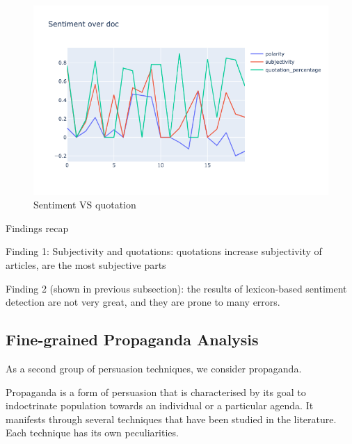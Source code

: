 \begin{figure}[!htbp]
    \centering
    \includegraphics[width=\linewidth]{figures/sentiment_vs_quotation.png}
    \caption{Sentiment VS quotation}
    \label{fig:sentiment_vs_quotation}
\end{figure}


Findings recap

Finding 1:
Subjectivity and quotations: quotations increase subjectivity of articles, are the most subjective parts

Finding 2 (shown in previous subsection): the results of lexicon-based sentiment detection are not very great, and they are prone to many errors.


\subsection{\statusorange Fine-grained Propaganda Analysis}
\label{ssec:lp_techniques_propaganda}

As a second group of persuasion techniques, we consider \gls{propaganda}.

Propaganda is a form of persuasion that is characterised by its goal to indoctrinate population towards an individual or a particular agenda. It manifests through several techniques that have been studied in the literature. Each technique has its own peculiarities.


